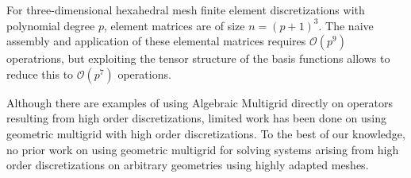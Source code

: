 \documentclass[smallcondensed,final]{svjour3}     %
\begin{document}
For three-dimensional hexahedral mesh finite element discretizations
with polynomial degree $p$, element matrices are of size
$n=(p+1)^3$. The naive assembly and application of these elemental
matrices requires $\mathcal O(p^9)$ operatrions, but exploiting the
tensor structure of the basis functions allows to reduce this to
$\mathcal O(p^7)$ operations.


Although there are examples of using Algebraic Multigrid directly on
operators resulting from high order discretizations, limited work
has been done on using geometric multigrid with high order
discretizations. To the best of our knowledge, no prior work on using
geometric multigrid for solving systems arising from high order
discretizations on arbitrary geometries using highly adapted meshes.








\end{document}
